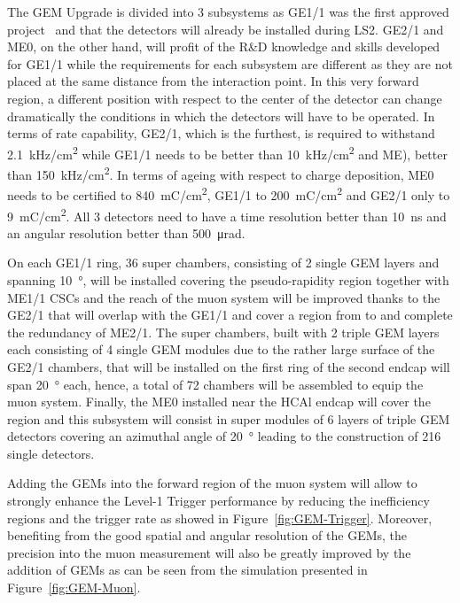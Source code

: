 	The GEM Upgrade is divided into 3 subsystems as GE1/1 was the first approved project~\cite{GEM11TDR} and that the detectors will already be installed during LS2. GE2/1 and ME0, on the other hand, will profit of the R\&D knowledge and skills developed for GE1/1 while the requirements for each subsystem are different as they are not placed at the same distance from the interaction point. In this very forward region, a different position with respect to the center of the detector can change dramatically the conditions in which the detectors will have to be operated. In terms of rate capability, GE2/1, which is the furthest, is required to withstand \SI{2.1}{kHz/cm^2} while GE1/1 needs to be better than \SI{10}{kHz/cm^2} and ME), better than \SI{150}{kHz/cm^2}. In terms of ageing with respect to charge deposition, ME0 needs to be certified to \SI{840}{mC/cm^2}, GE1/1 to \SI{200}{mC/cm^2} and GE2/1 only to \SI{9}{mC/cm^2}. All 3 detectors need to have a time resolution better than \SI{10}{ns} and an angular resolution better than \SI{500}{\micro rad}.
	
	On each GE1/1 ring, 36 super chambers, consisting of 2 single GEM layers and spanning \SI{10}{\degree}, will be installed covering the pseudo-rapidity region  together with ME1/1 CSCs and the reach of the muon system will be improved thanks to the GE2/1 that will overlap with the GE1/1 and cover a region from  to  and complete the redundancy of ME2/1. The super chambers, built with 2 triple GEM layers each consisting of 4 single GEM modules due to the rather large surface of the GE2/1 chambers, that will be installed on the first ring of the second endcap will span \SI{20}{\degree} each, hence, a total of 72 chambers will be assembled to equip the muon system. Finally, the ME0 installed near the HCAl endcap will cover the region  and this subsystem will consist in super modules of 6 layers of triple GEM detectors covering an azimuthal angle of \SI{20}{\degree} leading to the construction of 216 single detectors.
	
	Adding the GEMs into the forward region of the muon system will allow to strongly enhance the Level-1 Trigger performance by reducing the inefficiency regions and the trigger rate as showed in Figure~\ref{fig:GEM-Trigger}. Moreover, benefiting from the good spatial and angular resolution of the GEMs, the precision into the muon measurement will also be greatly improved by the addition of GEMs as can be seen from the simulation presented in Figure~\ref{fig:GEM-Muon}.
	

